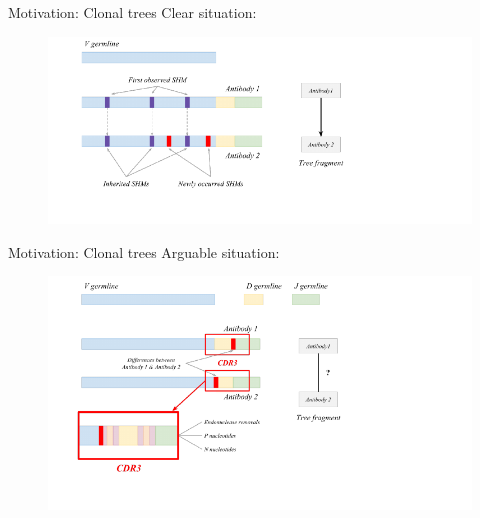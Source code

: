 \documentclass{beamer}\usepackage[]{graphicx}\usepackage[]{color}
\begin{document}
\begin{frame}{Motivation: Clonal trees}
  Clear situation:
  \begin{figure}[h]
    \includegraphics[width=400pt]{Pictures/clonal_trees1.pdf}
  \end{figure}
\end{frame}

\begin{frame}{Motivation: Clonal trees}
  Arguable situation:
  \begin{figure}[h]
    \includegraphics[width=400pt]{Pictures/clonal_trees2.pdf}
  \end{figure}
\end{frame}
\end{document}
